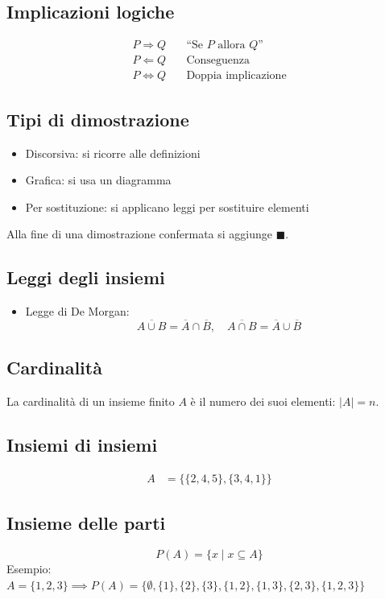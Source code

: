 \documentclass[a4paper,12pt]{article}
\begin{document}
\subsection{Implicazioni logiche}
\begin{align*}
P \Rightarrow Q &\quad \text{“Se $P$ allora $Q$”} \\
P \Leftarrow Q &\quad \text{Conseguenza} \\
P \Leftrightarrow Q &\quad \text{Doppia implicazione}
\end{align*}

\subsection{Tipi di dimostrazione}
\begin{itemize}
    \item Discorsiva: si ricorre alle definizioni
    \item Grafica: si usa un diagramma
    \item Per sostituzione: si applicano leggi per sostituire elementi
\end{itemize}
Alla fine di una dimostrazione confermata si aggiunge $\blacksquare$.

\subsection{Leggi degli insiemi}
\begin{itemize}
    \item Legge di De Morgan: 
    \[
    \overline{A \cup B} = \overline{A} \cap \overline{B}, \quad 
    \overline{A \cap B} = \overline{A} \cup \overline{B}
    \]
\end{itemize}

\subsection{Cardinalità}
La cardinalità di un insieme finito $A$ è il numero dei suoi elementi: $|A| = n$.

\subsection{Insiemi di insiemi}
\begin{align*}
A &= \{\{2,4,5\},\{3,4,1\}\}
\end{align*}

\subsection{Insieme delle parti}
\[
P(A) = \{ x \mid x \subseteq A\}
\]
Esempio: $A=\{1,2,3\} \implies P(A) = \{\emptyset, \{1\}, \{2\}, \{3\}, \{1,2\}, \{1,3\}, \{2,3\}, \{1,2,3\}\}$
\end{document}
